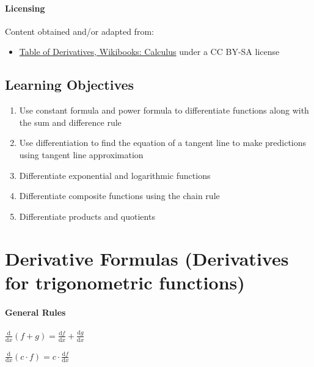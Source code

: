 \paragraph{Licensing}



Content obtained and/or adapted from:

\begin{itemize}
    \item \href{https://en.wikibooks.org/wiki/Calculus/Tables_of_Derivatives}{Table of Derivatives, Wikibooks: Calculus} under a CC BY-SA license
\end{itemize}

\subsection{Learning Objectives}

\begin{enumerate}
    \item Use constant formula and power formula to differentiate functions along with the sum and difference rule
    \item Use differentiation to find the equation of a tangent line to make predictions using tangent line approximation
    \item Differentiate exponential and logarithmic functions
    \item Differentiate composite functions using the chain rule
    \item Differentiate products and quotients
\end{enumerate}

\section{Derivative Formulas (Derivatives for trigonometric functions)}
\label{sec:derivative-formulas-derivatives-for-trigonometric-functions}

\paragraph{General Rules}
$
\frac{\mathrm{d}}{\mathrm{d}x}(f+g)=\frac{\mathrm{d}f}{\mathrm{d}x}+\frac{\mathrm{d}g}{\mathrm{d}x}
$



$
\frac{\mathrm{d}}{\mathrm{d}x}(c\cdot f)=c\cdot\frac{\mathrm{d}f}{\mathrm{d}x}
$



